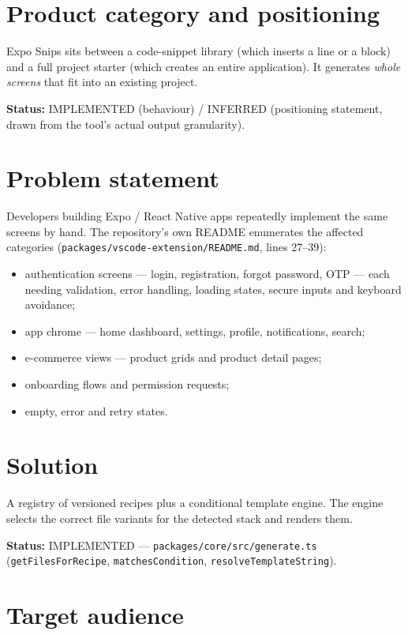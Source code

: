 \section{Product category and positioning}

Expo Snips sits between a code-snippet library (which inserts a line or a block)
and a full project starter (which creates an entire application). It generates
\emph{whole screens} that fit into an existing project.

\textbf{Status:} IMPLEMENTED (behaviour) / INFERRED (positioning statement, drawn
from the tool's actual output granularity).

\section{Problem statement}

Developers building Expo / React Native apps repeatedly implement the same
screens by hand. The repository's own README enumerates the affected categories
(\texttt{packages/vscode-extension/README.md}, lines 27--39):

\begin{itemize}
  \item authentication screens --- login, registration, forgot password, OTP ---
        each needing validation, error handling, loading states, secure inputs
        and keyboard avoidance;
  \item app chrome --- home dashboard, settings, profile, notifications, search;
  \item e-commerce views --- product grids and product detail pages;
  \item onboarding flows and permission requests;
  \item empty, error and retry states.
\end{itemize}

\section{Solution}

A registry of versioned recipes plus a conditional template engine. The engine
selects the correct file variants for the detected stack and renders them.

\textbf{Status:} IMPLEMENTED --- \texttt{packages/core/src/generate.ts}
(\texttt{getFilesForRecipe}, \texttt{matchesCondition},
\texttt{resolveTemplateString}).

\section{Target audience}

